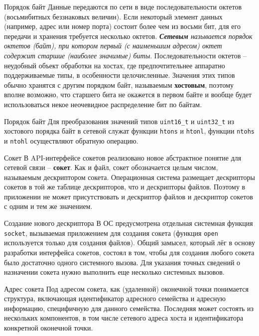 \begin{frame}{Порядок байт}
Данные передаются по сети в виде последовательности октетов (восьмибитных беззнаковых величин). Если некоторый элемент данных (например, адрес или номер порта) состоит более чем из восьми бит, для его передачи и хранения требуется несколько октетов. 
{\itshape {\bfseries Сетевым} называется порядок октетов (байт), при котором первый (с наименьшим адресом) октет содержит старшие (наиболее значимые) биты}. 
\pause
Последовательности октетов -- неудобный объект обработки на хостах, где предпочтительнее аппаратно поддерживаемые типы, в особенности целочисленные. Значения этих типов обычно хранятся с другим порядком байт, называемым {\bfseries хостовым}, поэтому вполне возможно, что старшего бита не окажется в первом байте и вообще будет использоваться некое неочевидное распределение бит по байтам. 
\end{frame}

\begin{frame}{Порядок байт}
Для преобразования значений типов {\tt uint16\_t} и {\tt uint32\_t} из хостового порядка байт в сетевой служат функции {\tt htons} и {\tt htonl}, функции {\tt ntohs} и {\tt ntohl} осуществляют обратную операцию. 
\end{frame}

\begin{frame}{Сокет}
В API-интерфейсе сокетов реализовано новое абстрактное понятие для сетевой связи -- {\bf сокет}. Как и файл,  сокет обозначается целым числом,  называемым дескриптором сокета. Операционная система размещает дескрипторы сокетов в той же таблице дескрипторов,  что и дескрипторы файлов. Поэтому в приложении не может присутствовать и дескриптор файлов и дескриптор сокетов с одним и тем же значением.
\end{frame}

\begin{frame}{Создание нового дескриптора}
В ОС предусмотрена отдельная системная функция {\tt socket},  вызываемая приложением для создания 
сокета (функция {\tt open} используется только для создания файлов). Общий замысел,  
который лёг в основу разработки интерфейса сокетов,  состоял в том,  чтобы для создания любого сокета
было достаточно одного системного вызова. Для указания точных сведений о назначении сокета
нужно выполнить еще несколько системных вызовов.
\end{frame}

\begin{frame}{Адрес сокета}
Под адресом сокета, как (удаленной) оконечной точки понимается структура, включающая идентификатор адресного семейства и адресную информацию, специфичную для данного семейства. Последняя может состоять из нескольких компонентов, в том числе сетевого адреса хоста и идентификатора конкретной оконечной точки. 
\end{frame}


